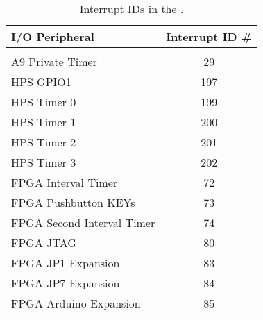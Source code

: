 













\begin{table}[h]
    \begin{center}
    \begin{tabular}{l|c}
            \textbf{I/O Peripheral} &
            \textbf{Interrupt ID \#}
				\\\hline\vspace{-3mm}\\
            A9 Private Timer & 29
        \\
            HPS GPIO1 & 197
        \\
            HPS Timer 0 & 199
        \\
            HPS Timer 1 & 200
        \\
            HPS Timer 2 & 201
        \\
            HPS Timer 3 & 202
        \\
		  FPGA Interval Timer & 72
        \\
		  FPGA Pushbutton KEYs & 73
        \\
		  FPGA Second Interval Timer & 74
        \\
		  FPGA JTAG & 80
        \\
		  FPGA JP1 Expansion & 83
        \\
		  FPGA JP7 Expansion & 84
        \\
		  FPGA Arduino Expansion & 85
        \\
    \end{tabular}
    \caption{Interrupt IDs in the \systemName.}
	 \label{tab:irq}
    \end{center}
\end{table}









